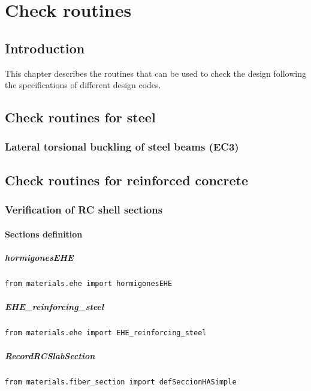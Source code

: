 \chapter{Check routines}
\section{Introduction}
This chapter describes the routines that can be used to check the design following the specifications of different design codes.

\section{Check routines for steel}

\subsection{Lateral torsional buckling of steel beams (EC3)}
 

\section{Check routines for reinforced concrete}
\subsection{Verification of RC shell sections}
\subsubsection{Sections definition}
\paragraph{hormigonesEHE}
\begin{verbatim}
from materials.ehe import hormigonesEHE
\end{verbatim}

\paragraph{EHE\_reinforcing\_steel}
\begin{verbatim}
from materials.ehe import EHE_reinforcing_steel
\end{verbatim}

\paragraph{RecordRCSlabSection}
\begin{verbatim}
from materials.fiber_section import defSeccionHASimple
\end{verbatim}


